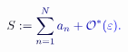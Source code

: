\documentclass[12pt]{article}
\begin{document}
\makeatletter
\renewcommand*{\@textcolor}[3]{%
  \protect\leavevmode
  \begingroup
    \color#1{#2}#3%
  \endgroup
}
\makeatother
\begin{displaymath}
\mathcolor[RGB]{0,0,15}{S} \mathcolor[RGB]{0,0,30}{:} \mathcolor[RGB]{0,0,45}{=} \mathcolor[RGB]{0,0,60}{\sum} _ { \mathcolor[RGB]{0,0,75}{n} \mathcolor[RGB]{0,0,90}{=} \mathcolor[RGB]{0,0,105}{1} } ^ { \mathcolor[RGB]{0,0,120}{N} } \mathcolor[RGB]{0,0,135}{a} _ { \mathcolor[RGB]{0,0,150}{n} } \mathcolor[RGB]{0,0,165}{+} \mathcal { \mathcolor[RGB]{0,0,180}{O} } ^ { \mathcolor[RGB]{0,0,195}{*} } \mathcolor[RGB]{0,0,210}{(} \mathcolor[RGB]{0,0,225}{\varepsilon} \mathcolor[RGB]{0,0,240}{)} \mathcolor[RGB]{0,0,255}{.}
\end{displaymath}
\end{document}
